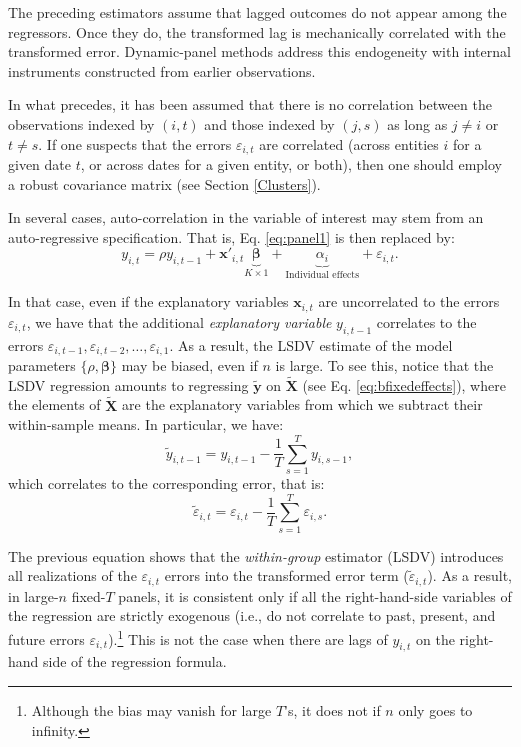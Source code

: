 \documentclass[
  11pt,
]{book}
\theoremstyle{definition}
\theoremstyle{definition}
\theoremstyle{definition}
\theoremstyle{definition}
\theoremstyle{remark}
\begin{document}
The preceding estimators assume that lagged outcomes do not appear among the regressors. Once they do, the transformed lag is mechanically correlated with the transformed error. Dynamic-panel methods address this endogeneity with internal instruments constructed from earlier observations.

In what precedes, it has been assumed that there is no correlation between the observations indexed by \((i,t)\) and those indexed by \((j,s)\) as long as \(j \ne i\) or \(t \ne s\). If one suspects that the errors \(\varepsilon_{i,t}\) are correlated (across entities \(i\) for a given date \(t\), or across dates for a given entity, or both), then one should employ a robust covariance matrix (see Section \ref{Clusters}).

In several cases, auto-correlation in the variable of interest may stem from an auto-regressive specification. That is, Eq. \eqref{eq:panel1} is then replaced by:
\begin{equation}
y_{i,t} = \rho y_{i,t-1} + \mathbf{x}'_{i,t}\underbrace{\boldsymbol\beta}_{K \times 1} + \underbrace{\alpha_i}_{\mbox{Individual effects}} + \varepsilon_{i,t}.\label{eq:paneldyn}
\end{equation}

In that case, even if the explanatory variables \(\mathbf{x}_{i,t}\) are uncorrelated to the errors \(\varepsilon_{i,t}\), we have that the additional \emph{explanatory variable} \(y_{i,t-1}\) correlates to the errors \(\varepsilon_{i,t-1},\varepsilon_{i,t-2},\dots,\varepsilon_{i,1}\). As a result, the LSDV estimate of the model parameters \(\{\rho,\boldsymbol\beta\}\) may be biased, even if \(n\) is large. To see this, notice that the LSDV regression amounts to regressing \(\widetilde{\mathbf{y}}\) on \(\widetilde{\mathbf{X}}\) (see Eq. \eqref{eq:bfixedeffects}), where the elements of \(\widetilde{\mathbf{X}}\) are the explanatory variables from which we subtract their within-sample means. In particular, we have:
\[
\tilde{y}_{i,t-1} = y_{i,t-1} - \frac{1}{T} \sum_{s=1}^{T} y_{i,s-1},
\]
which correlates to the corresponding error, that is:
\[
\tilde{\varepsilon}_{i,t} = \varepsilon_{i,t} - \frac{1}{T} \sum_{s=1}^{T} \varepsilon_{i,s}.
\]

The previous equation shows that the \emph{within-group} estimator (LSDV) introduces all realizations of the \(\varepsilon_{i,t}\) errors into the transformed error term (\(\tilde{\varepsilon}_{i,t}\)). As a result, in large-\(n\) fixed-\(T\) panels, it is consistent only if all the right-hand-side variables of the regression are strictly exogenous (i.e., do not correlate to past, present, and future errors \(\varepsilon_{i,t}\)).\footnote{Although the bias may vanish for large \(T\)'s, it does not if \(n\) only goes to infinity.} This is not the case when there are lags of \(y_{i,t}\) on the right-hand side of the regression formula.
\end{document}

